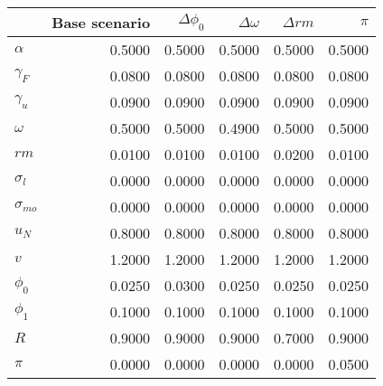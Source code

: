 \begin{tabular}{lrrrrr}
\toprule
{} &  Base scenario &  $\Delta \phi_0$ &  $\Delta \omega$ &  $\Delta rm$ &  $\pi$ \\
\midrule
$\alpha$      &         0.5000 &           0.5000 &           0.5000 &       0.5000 & 0.5000 \\
$\gamma_F$    &         0.0800 &           0.0800 &           0.0800 &       0.0800 & 0.0800 \\
$\gamma_u$    &         0.0900 &           0.0900 &           0.0900 &       0.0900 & 0.0900 \\
$\omega$      &         0.5000 &           0.5000 &           0.4900 &       0.5000 & 0.5000 \\
$rm$          &         0.0100 &           0.0100 &           0.0100 &       0.0200 & 0.0100 \\
$\sigma_{l}$  &         0.0000 &           0.0000 &           0.0000 &       0.0000 & 0.0000 \\
$\sigma_{mo}$ &         0.0000 &           0.0000 &           0.0000 &       0.0000 & 0.0000 \\
$u_N$         &         0.8000 &           0.8000 &           0.8000 &       0.8000 & 0.8000 \\
$v$           &         1.2000 &           1.2000 &           1.2000 &       1.2000 & 1.2000 \\
$\phi_0$      &         0.0250 &           0.0300 &           0.0250 &       0.0250 & 0.0250 \\
$\phi_1$      &         0.1000 &           0.1000 &           0.1000 &       0.1000 & 0.1000 \\
$R$           &         0.9000 &           0.9000 &           0.9000 &       0.7000 & 0.9000 \\
$\pi$         &         0.0000 &           0.0000 &           0.0000 &       0.0000 & 0.0500 \\
\bottomrule
\end{tabular}

